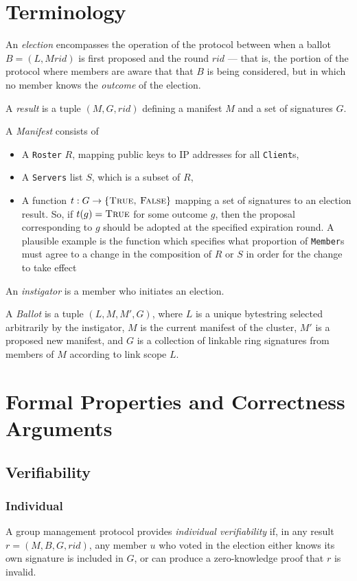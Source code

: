 \section{Terminology}
An \emph{election} encompasses the operation of the protocol between when a
ballot $B = (L, M rid)$ is first proposed and the round $rid$ --- that is, the
portion of the protocol where members are aware that that $B$ is being
considered, but in which no member knows the \emph{outcome} of the election.

A \emph{result} is a tuple $(M, G, rid)$ defining a manifest $M$ and a set of
signatures $G$.

A \emph{Manifest} consists of
\begin{itemize}
  \item A \texttt{Roster} $R$, mapping public keys to IP addresses for all
    \texttt{Client}s,
  \item A \texttt{Servers} list $S$, which is a subset of $R$,
  \item A function $t : G \to \{\textsc{True, False}\}$ mapping a set of
    signatures to an election result. So, if $t(g) = \textsc{True}$ for some
    outcome $g$, then the proposal corresponding to $g$ should
    be adopted at the specified expiration round. A plausible example is the
    function which specifies what proportion of \texttt{Member}s must agree to a
    change in the composition of $R$ or $S$ in order for the change to take
    effect
\end{itemize}

An \emph{instigator} is a member who initiates an election.

A \emph{Ballot} is a tuple $(L, M, M', G)$, where $L$ is a unique bytestring
selected arbitrarily by the instigator, $M$ is the current manifest of the
cluster, $M'$ is a proposed new manifest, and $G$ is a collection of linkable
ring signatures from members of $M$ according to link scope $L$.


\section{Formal Properties and Correctness Arguments}
  \subsection{Verifiability}
    \subsubsection{Individual}
    A group management protocol provides \emph{individual verifiability} if, in
    any result $r = (M, B, G, rid)$, any member $u$ who voted in the election
    either knows its own signature is included in $G$, or can produce a
    zero-knowledge proof that $r$ is invalid.

